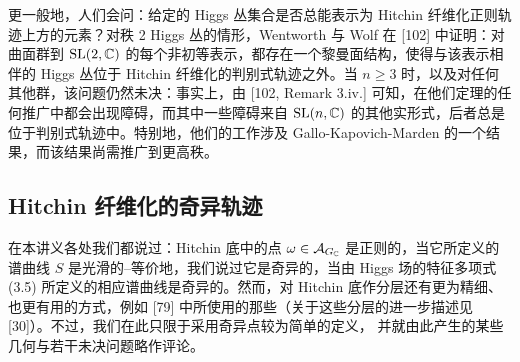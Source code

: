 更一般地，人们会问：给定的 Higgs 丛集合是否总能表示为 Hitchin 纤维化正则轨迹上方的元素？对秩 2 Higgs 丛的情形，Wentworth 与 Wolf 在 [102] 中证明：对曲面群到 $\mathrm{SL}(2,\mathbb{C})$ 的每个非初等表示，都存在一个黎曼面结构，使得与该表示相伴的 Higgs 丛位于 Hitchin 纤维化的判别式轨迹之外。当 $n\ge 3$ 时，以及对任何其他群，该问题仍然未决：事实上，由 [102, Remark 3.iv.] 可知，在他们定理的任何推广中都会出现障碍，而其中一些障碍来自 $\mathrm{SL}(n,\mathbb{C})$ 的其他实形式，后者总是位于判别式轨迹中。特别地，他们的工作涉及 Gallo-Kapovich-Marden 的一个结果，而该结果尚需推广到更高秩。

\subsection{Hitchin 纤维化的奇异轨迹}

在本讲义各处我们都说过：Hitchin 底中的点 $\omega\in\mathcal{A}_{G_{\mathbb{C}}}$ 是正则的，当它所定义的谱曲线 $S$ 是光滑的--等价地，我们说过它是奇异的，当由 Higgs 场的特征多项式 (3.5) 所定义的相应谱曲线是奇异的。然而，对 Hitchin 底作分层还有更为精细、也更有用的方式，例如 [79] 中所使用的那些（关于这些分层的进一步描述见 [30]）。不过，我们在此只限于采用奇异点较为简单的定义，
并就由此产生的某些几何与若干未决问题略作评论。

